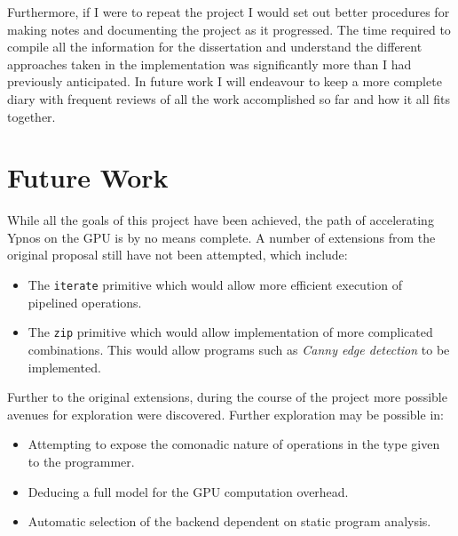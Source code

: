 \documentclass[12pt,a4paper,twoside]{scrbook}
\begin{document}
Furthermore, if I were to repeat the project I would set out better procedures
for making notes and documenting the project as it progressed. The time required
to compile all the information for the dissertation and understand the different
approaches taken in the implementation was significantly more than I had
previously anticipated. In future work I will endeavour to keep a more complete
diary with frequent reviews of all the work accomplished so far and how it all
fits together.

\section{Future Work}

While all the goals of this project have been achieved, the path of accelerating
Ypnos on the GPU is by no means complete. A number of extensions from the
original proposal still have not been attempted, which include:

\begin{itemize}
\item
  The \texttt{iterate} primitive which would allow more efficient execution of
  pipelined operations.
\item
  The \texttt{zip} primitive which would allow implementation of more
  complicated combinations. This would allow programs such as \emph{Canny edge
    detection} to be implemented.
\end{itemize}

Further to the original extensions, during the course of the project more
possible avenues for exploration were discovered. Further exploration may be
possible in:

\begin{itemize}
\item
  Attempting to expose the comonadic nature of operations in the type given to
  the programmer.
\item
  Deducing a full model for the GPU computation overhead.
\item
  Automatic selection of the backend dependent on static program analysis.
\end{itemize}

\printbibliography[heading=bibintoc]

\appendix


\end{document}
